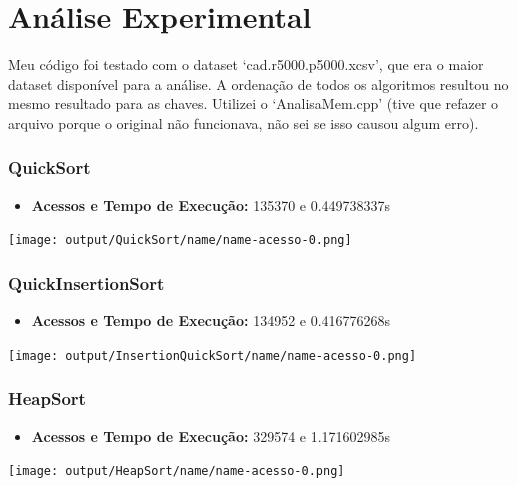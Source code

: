 \documentclass[a4paper,12pt]{article}
\begin{document}
\section{Análise Experimental}
\hspace*{1cm}

Meu código foi testado com o dataset `cad.r5000.p5000.xcsv', que era o maior dataset disponível para a análise. A ordenação de todos os algoritmos resultou no mesmo resultado para as chaves. 
Utilizei o `AnalisaMem.cpp' (tive que refazer o arquivo porque o original não funcionava, não sei se isso causou algum erro).

\subsubsection{QuickSort}

\begin{itemize}
    \item \textbf{Acessos e Tempo de Execução:} 135370 e 0.449738337s
\end{itemize}

\begin{center}
    \texttt{[image: output/QuickSort/name/name-acesso-0.png]}
\end{center}

\subsubsection{QuickInsertionSort}

\begin{itemize}
    \item \textbf{Acessos e Tempo de Execução:} 134952 e  0.416776268s
\end{itemize}

\begin{center}
    \texttt{[image: output/InsertionQuickSort/name/name-acesso-0.png]}
\end{center}

\subsubsection{HeapSort}

\begin{itemize}
    \item \textbf{Acessos e Tempo de Execução:} 329574 e 1.171602985s
\end{itemize}

\begin{center}
    \texttt{[image: output/HeapSort/name/name-acesso-0.png]}
\end{center}
\end{document}

